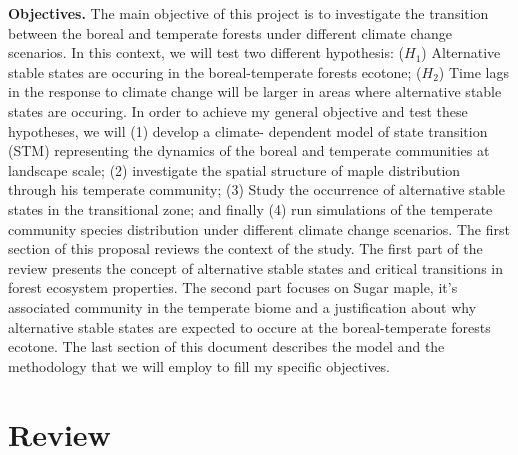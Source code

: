 \textbf{Objectives.} The main objective of this project is to investigate the
transition between the boreal and temperate forests under different climate
change scenarios. In this context, we will test two different hypothesis:
($H_1$) Alternative stable states are occuring in the boreal-temperate forests
ecotone;  ($H_2$) Time lags in the response to climate change will be larger
in areas where alternative stable states are occuring. In order to achieve my
general objective and test these hypotheses, we will (1) develop a climate-
dependent model of state transition (STM) representing the dynamics of the
boreal and temperate communities at landscape scale; (2) investigate the
spatial structure of maple distribution through his temperate community; (3)
Study the occurrence of alternative stable states in the transitional zone;
and finally (4) run simulations of the temperate community species
distribution under different climate change scenarios. The first section of
this proposal reviews the context of the study. The first part of the review
presents the concept of alternative stable states and critical transitions in
forest ecosystem properties. The second part focuses on Sugar maple, it's
associated community in the temperate biome and a justification about why
alternative stable states are expected to occure at the boreal-temperate
forests ecotone. The last section of this document describes the model and
the methodology that we will employ to fill my specific objectives. 

\section{Review} 

